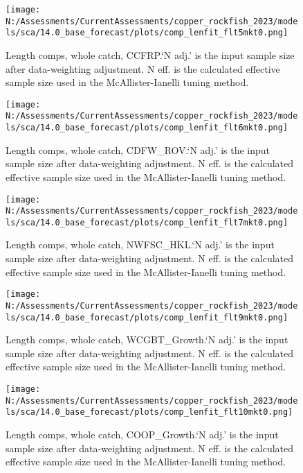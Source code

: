 \documentclass[11pt,
  english,
  letterpaper,
]{article}
\begin{document}
\begin{figure}
\centering
\texttt{[image: N:/Assessments/CurrentAssessments/copper\_rockfish\_2023/models/sca/14.0\_base\_forecast/plots/comp\_lenfit\_flt5mkt0.png]}
\caption{Length comps, whole catch, CCFRP.`N adj.' is the input sample size after data-weighting adjustment. N eff. is the calculated effective sample size used in the McAllister-Ianelli tuning method.\label{fig:comp_lenfit_flt5mkt0}}
\end{figure}

\begin{figure}
\centering
\texttt{[image: N:/Assessments/CurrentAssessments/copper\_rockfish\_2023/models/sca/14.0\_base\_forecast/plots/comp\_lenfit\_flt6mkt0.png]}
\caption{Length comps, whole catch, CDFW\_ROV.`N adj.' is the input sample size after data-weighting adjustment. N eff. is the calculated effective sample size used in the McAllister-Ianelli tuning method.\label{fig:comp_lenfit_flt6mkt0}}
\end{figure}

\begin{figure}
\centering
\texttt{[image: N:/Assessments/CurrentAssessments/copper\_rockfish\_2023/models/sca/14.0\_base\_forecast/plots/comp\_lenfit\_flt7mkt0.png]}
\caption{Length comps, whole catch, NWFSC\_HKL.`N adj.' is the input sample size after data-weighting adjustment. N eff. is the calculated effective sample size used in the McAllister-Ianelli tuning method.\label{fig:comp_lenfit_flt7mkt0}}
\end{figure}

\begin{figure}
\centering
\texttt{[image: N:/Assessments/CurrentAssessments/copper\_rockfish\_2023/models/sca/14.0\_base\_forecast/plots/comp\_lenfit\_flt9mkt0.png]}
\caption{Length comps, whole catch, WCGBT\_Growth.`N adj.' is the input sample size after data-weighting adjustment. N eff. is the calculated effective sample size used in the McAllister-Ianelli tuning method.\label{fig:comp_lenfit_flt9mkt0}}
\end{figure}

\begin{figure}
\centering
\texttt{[image: N:/Assessments/CurrentAssessments/copper\_rockfish\_2023/models/sca/14.0\_base\_forecast/plots/comp\_lenfit\_flt10mkt0.png]}
\caption{Length comps, whole catch, COOP\_Growth.`N adj.' is the input sample size after data-weighting adjustment. N eff. is the calculated effective sample size used in the McAllister-Ianelli tuning method.\label{fig:comp_lenfit_flt10mkt0}}
\end{figure}
\end{document}

